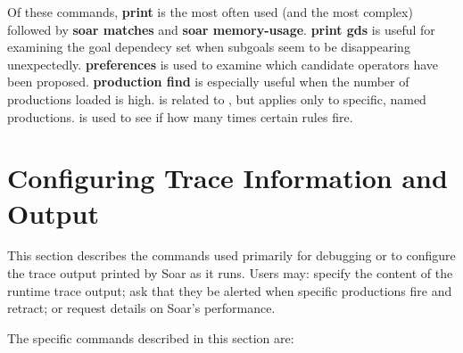Of these commands, \textbf{print} is the most often used (and the most
complex) followed by \textbf{soar matches} and \textbf{soar memory-usage}. \textbf{print gds}
is useful for examining the goal dependecy set when subgoals seem to
be disappearing unexpectedly. \textbf{preferences}
is used to examine which candidate operators have been proposed.
\textbf{production find} is especially useful when the number of
productions loaded is high.   is related to , but applies only 
to specific, named productions.  is used to see if how many times
certain rules fire.  






\section{Configuring Trace Information and Output}
\label{DEBUG}

This section describes the commands used primarily for debugging or
to configure the trace output printed by Soar as it runs.  Users may:
specify the content of the runtime trace output; ask that
they be alerted when specific productions fire and retract; 
or request details on Soar's performance.

The specific commands described in this section are:


